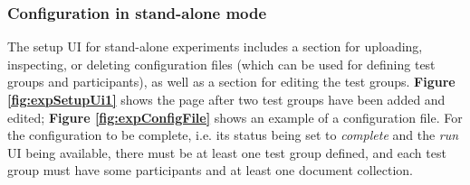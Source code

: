 \documentclass[a4paper]{usiinfbachelorproject}
\begin{document}
\begin{appendices}
        \subsubsection{Configuration in stand-alone mode}

        The setup UI for stand-alone experiments includes a section for uploading, inspecting, or deleting configuration files (which can be used for
        defining test groups and participants), as well as a section for editing the test groups. \textbf{Figure \ref{fig:expSetupUi1}}
        shows the page after two test groups have been added and edited; \textbf{Figure \ref{fig:expConfigFile}} shows an example of a configuration file. 
        For the configuration to be complete, i.e. its status being set to 
        \emph{complete} and the \emph{run} UI being available, there must be at least one test group defined, and each test group must 
        have some participants and at least one document collection.


\end{appendices}
\end{document}
